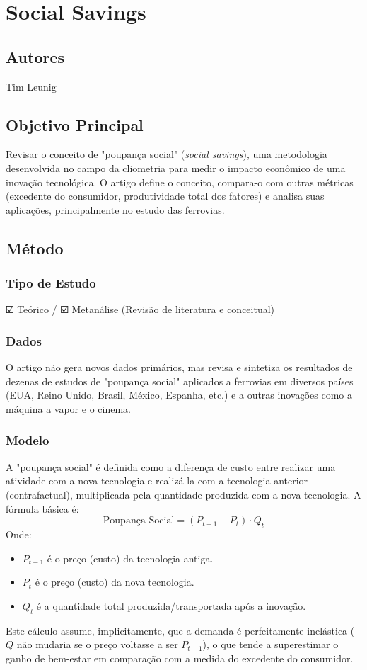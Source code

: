\documentclass[12pt]{article}
\begin{document}
\newpage

\section{Social Savings}

\subsection*{Autores}
Tim Leunig

\subsection*{Objetivo Principal}
Revisar o conceito de "poupança social" (\textit{social savings}), uma metodologia desenvolvida no campo da cliometria para medir o impacto econômico de uma inovação tecnológica. O artigo define o conceito, compara-o com outras métricas (excedente do consumidor, produtividade total dos fatores) e analisa suas aplicações, principalmente no estudo das ferrovias.

\subsection*{Método}

\subsubsection*{Tipo de Estudo}
☑️ Teórico / ☑️ Metanálise (Revisão de literatura e conceitual)

\subsubsection*{Dados}
O artigo não gera novos dados primários, mas revisa e sintetiza os resultados de dezenas de estudos de "poupança social" aplicados a ferrovias em diversos países (EUA, Reino Unido, Brasil, México, Espanha, etc.) e a outras inovações como a máquina a vapor e o cinema.

\subsubsection*{Modelo}
A "poupança social" é definida como a diferença de custo entre realizar uma atividade com a nova tecnologia e realizá-la com a tecnologia anterior (contrafactual), multiplicada pela quantidade produzida com a nova tecnologia. A fórmula básica é:
$$ \text{Poupança Social} = (P_{t-1} - P_t) \cdot Q_t $$
Onde:
\begin{itemize}
    \item $P_{t-1}$ é o preço (custo) da tecnologia antiga.
    \item $P_t$ é o preço (custo) da nova tecnologia.
    \item $Q_t$ é a quantidade total produzida/transportada após a inovação.
\end{itemize}
Este cálculo assume, implicitamente, que a demanda é perfeitamente inelástica ($Q$ não mudaria se o preço voltasse a ser $P_{t-1}$), o que tende a superestimar o ganho de bem-estar em comparação com a medida do excedente do consumidor.
\end{document}
